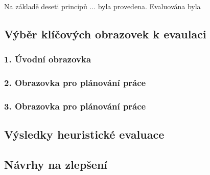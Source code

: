 

Na základě deseti principů ... byla provedena.
Evaluována byla

\subsection{Výběr klíčových obrazovek k evaulaci} %

\subsubsection{1. Úvodní obrazovka}

\subsubsection{2. Obrazovka pro plánování práce}

\subsubsection{3. Obrazovka pro plánování práce}

\subsection{Výsledky heuristické evaluace}

\subsection{Návrhy na zlepšení}

